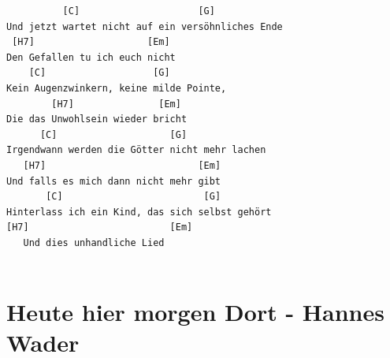 \documentclass[
]{book}
\let\stdsection\section
\renewcommand\section{\clearpage\stdsection}
\begin{document}
\begin{verbatim}
          [C]                     [G]
Und jetzt wartet nicht auf ein versöhnliches Ende 
 [H7]                    [Em]
Den Gefallen tu ich euch nicht 
    [C]                   [G]
Kein Augenzwinkern, keine milde Pointe,
        [H7]               [Em]
Die das Unwohlsein wieder bricht
      [C]                    [G]
Irgendwann werden die Götter nicht mehr lachen 
   [H7]                           [Em]
Und falls es mich dann nicht mehr gibt 
       [C]                         [G]
Hinterlass ich ein Kind, das sich selbst gehört
[H7]                         [Em]
   Und dies unhandliche Lied
   

\end{verbatim}

\hypertarget{heute-hier-morgen-dort---hannes-wader}{%
\section{Heute hier morgen Dort - Hannes Wader}\label{heute-hier-morgen-dort---hannes-wader}}
\end{document}
